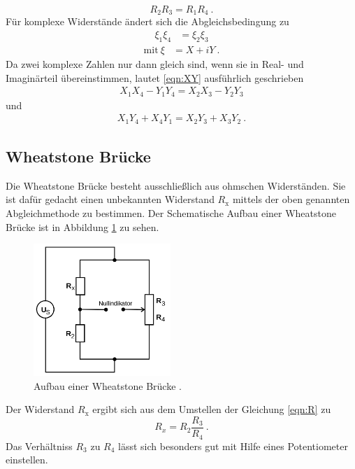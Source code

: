 \begin{equation}
  R_2 R_3 = R_1 R_4 \ .
  \label{eqn:R}
\end{equation}
Für komplexe Widerstände ändert sich die Abgleichsbedingung zu
\begin{align}
	\xi_1 \xi_4 & = \xi_2 \xi_3
	\label{eqn:XY}
\end{align}
\begin{align*}
		\text{mit} \ \xi & = X + iY \ .
\end{align*}
Da zwei komplexe Zahlen nur dann gleich sind, wenn sie in Real- und Imaginärteil übereinstimmen, lautet \ref{eqn:XY} ausführlich geschrieben
\begin{align}
	X_1 X_4 - Y_1 Y_4 = X_2 X_3 - Y_2 Y_3
	\label{eqn:XY1}
\end{align}
und
\begin{align}
	X_1 Y_4 + X_4 Y_1 = X_2 Y_3 + X_3 Y_2 \ .
	\label{eqn:XY2}
\end{align}

\subsection{Wheatstone Brücke}
Die Wheatstone Brücke besteht ausschließlich aus ohmschen Widerständen. Sie ist dafür gedacht einen unbekannten Widerstand $R_\text{x}$ mittels der oben genannten Abgleichmethode zu bestimmen. Der Schematische Aufbau einer Wheatstone Brücke ist in Abbildung \ref{fig:widerstand} zu sehen.
\begin{figure}[H]
      \centering
      \includegraphics[height=5cm]{picture/2.png}
      \caption{Aufbau einer Wheatstone Brücke \cite{sample}.}
      \label{fig:widerstand}
\end{figure}
Der Widerstand $R_\text{x}$ ergibt sich aus dem Umstellen der Gleichung \ref{eqn:R} zu
\begin{equation}
  R_x = R_2 \frac{R_3}{R_4} \ .
  \label{eqn:R_x}
\end{equation}
Das Verhältniss $R_3$ zu $R_4$ lässt sich besonders gut mit Hilfe eines Potentiometer einstellen.
